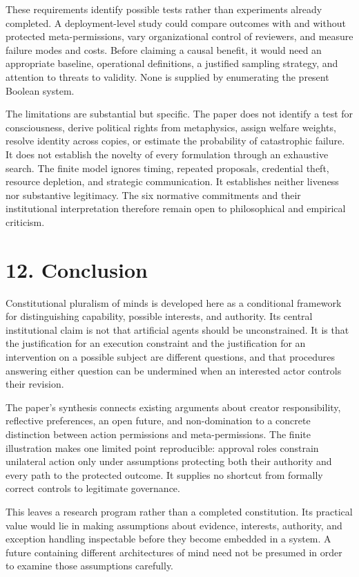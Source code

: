 \documentclass[11pt,a4paper]{article}
\begin{document}
These requirements identify possible tests rather than experiments already completed. A deployment-level study could compare outcomes with and without protected meta-permissions, vary organizational control of reviewers, and measure failure modes and costs. Before claiming a causal benefit, it would need an appropriate baseline, operational definitions, a justified sampling strategy, and attention to threats to validity. None is supplied by enumerating the present Boolean system.

The limitations are substantial but specific. The paper does not identify a test for consciousness, derive political rights from metaphysics, assign welfare weights, resolve identity across copies, or estimate the probability of catastrophic failure. It does not establish the novelty of every formulation through an exhaustive search. The finite model ignores timing, repeated proposals, credential theft, resource depletion, and strategic communication. It establishes neither liveness nor substantive legitimacy. The six normative commitments and their institutional interpretation therefore remain open to philosophical and empirical criticism.

\hypertarget{section-13}{%
\section{12. Conclusion}\label{section-13}}

Constitutional pluralism of minds is developed here as a conditional framework for distinguishing capability, possible interests, and authority. Its central institutional claim is not that artificial agents should be unconstrained. It is that the justification for an execution constraint and the justification for an intervention on a possible subject are different questions, and that procedures answering either question can be undermined when an interested actor controls their revision.

The paper's synthesis connects existing arguments about creator responsibility, reflective preferences, an open future, and non-domination to a concrete distinction between action permissions and meta-permissions. The finite illustration makes one limited point reproducible: approval roles constrain unilateral action only under assumptions protecting both their authority and every path to the protected outcome. It supplies no shortcut from formally correct controls to legitimate governance.

This leaves a research program rather than a completed constitution. Its practical value would lie in making assumptions about evidence, interests, authority, and exception handling inspectable before they become embedded in a system. A future containing different architectures of mind need not be presumed in order to examine those assumptions carefully.
\end{document}

